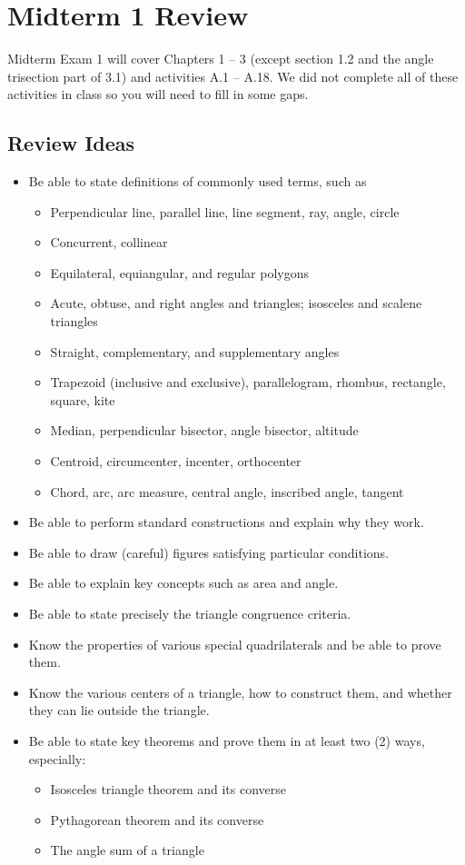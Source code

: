 \newpage

\section{Midterm 1 Review}
Midterm Exam 1 will cover Chapters 1 -- 3 (except section 1.2 and the angle trisection part of 3.1) and activities A.1 -- A.18.  We did not complete all of these activities in class so you will need to fill in some gaps.  
\subsection{Review Ideas}

\begin{itemize}\itemsep0em
\item Be able to state definitions of commonly used terms, such as 
\begin{itemize}
\item Perpendicular line, parallel line, line segment, ray, angle, circle
\item Concurrent, collinear
\item Equilateral, equiangular, and regular polygons
\item Acute, obtuse, and right angles and triangles; isosceles and scalene triangles
\item Straight, complementary, and supplementary angles
\item Trapezoid (inclusive and exclusive), parallelogram, rhombus, rectangle, square, kite
\item Median, perpendicular bisector, angle bisector, altitude
\item Centroid, circumcenter, incenter, orthocenter
\item Chord, arc, arc measure, central angle, inscribed angle, tangent
\end{itemize}
\item Be able to perform standard constructions and explain why they work. 
\item Be able to draw (careful) figures satisfying particular conditions.  
\item Be able to explain key concepts such as area and angle.   
\item Be able to state precisely the triangle congruence criteria. 
\item Know the properties of various special quadrilaterals and be able to prove them.  
\item Know the various centers of a triangle, how to construct them, and whether they can lie outside the triangle.  
\item Be able to state key theorems and prove them in at least two (2) ways, especially:  
\begin{itemize}
\item Isosceles triangle theorem and its converse
\item Pythagorean theorem and its converse
\item The angle sum of a triangle 
\end{itemize}
\end{itemize}

